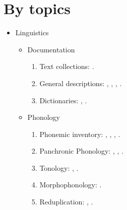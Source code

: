 \documentclass[oneside,a4paper,11pt]{article}
\newcommand{\langue}[2]{#1}
\begin{document}
\section{\langue{By topics}{Publications classées par domaine de recherche}}
\begin{itemize}
\item  \langue{Linguistics}{Linguistique} 
\begin{itemize}
\item  Documentation
\begin{enumerate}
\item  \langue{Text collections}{Collections de textes}: \cite{jacques10gesar}.
\item \langue{General descriptions}{Descriptions générales}: \cite{jacques04these}, \cite{jacques08}, \cite{jacques17sketch}, \cite{jacques17stau}.
\item \langue{Dictionaries}{Dictionnaires}: \cite{jacques15japhug}, \cite{jacques15khaling}.
\end{enumerate}


\item \langue{Phonology}{Phonologie}
\begin{enumerate}
\item  \langue{Phonemic inventory}{Inventaire phonémique}: \cite{jacques04these},  \cite{jacques12khaling}, \cite{jacques14cone}, \cite{jacques17ipa}.
\item  \langue{Panchronic Phonology}{Phonologie panchronique}:  \cite{jacques11lingua}, \cite{michaud-jacques12nasalite},     \cite{jacques13arapaho}.
\item   \langue{Tonology}{Tonologie}: \cite{jacques11pumi.tone}, \cite{jacques16tonogenesis}.
\item \langue{Morphophonology}{Morphophonologie}: \cite{jacques12khaling}.
\item \langue{Reduplication}{Réduplication}:  \cite{jacques04redupl},  \cite{jacques07redupl}.
\end{enumerate}


\end{itemize}
\end{itemize}
\end{document}
